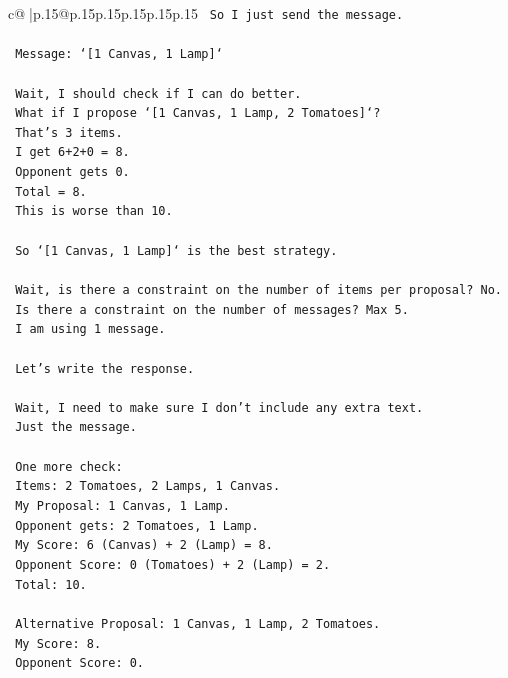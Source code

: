 \documentclass{article}
\begin{document}
{\begin{supertabular}{c@{$\;$}|p{.15\linewidth}@{}p{.15\linewidth}p{.15\linewidth}p{.15\linewidth}p{.15\linewidth}p{.15\linewidth}}
{{{\texttt{    So I just send the message.} \\
\\ 
\texttt{    Message: `{[}1 Canvas, 1 Lamp{]}`} \\
\\ 
\texttt{    Wait, I should check if I can do better.} \\
\texttt{    What if I propose `{[}1 Canvas, 1 Lamp, 2 Tomatoes{]}`?} \\
\texttt{    That's 3 items.} \\
\texttt{    I get 6+2+0 = 8.} \\
\texttt{    Opponent gets 0.} \\
\texttt{    Total = 8.} \\
\texttt{    This is worse than 10.} \\
\\ 
\texttt{    So `{[}1 Canvas, 1 Lamp{]}` is the best strategy.} \\
\\ 
\texttt{    Wait, is there a constraint on the number of items per proposal? No.} \\
\texttt{    Is there a constraint on the number of messages? Max 5.} \\
\texttt{    I am using 1 message.} \\
\\ 
\texttt{    Let's write the response.} \\
\\ 
\texttt{    Wait, I need to make sure I don't include any extra text.} \\
\texttt{    Just the message.} \\
\\ 
\texttt{    One more check:} \\
\texttt{    Items: 2 Tomatoes, 2 Lamps, 1 Canvas.} \\
\texttt{    My Proposal: 1 Canvas, 1 Lamp.} \\
\texttt{    Opponent gets: 2 Tomatoes, 1 Lamp.} \\
\texttt{    My Score: 6 (Canvas) + 2 (Lamp) = 8.} \\
\texttt{    Opponent Score: 0 (Tomatoes) + 2 (Lamp) = 2.} \\
\texttt{    Total: 10.} \\
\\ 
\texttt{    Alternative Proposal: 1 Canvas, 1 Lamp, 2 Tomatoes.} \\
\texttt{    My Score: 8.} \\
\texttt{    Opponent Score: 0.} \\
}}}
\end{supertabular}}
\end{document}
